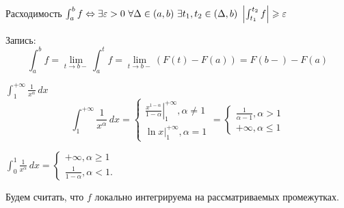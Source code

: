 \begin{Rem}
	Расходимость $\int_a^b f \Leftrightarrow \exists \varepsilon > 0 \ \forall \Delta \in (a, b) \ \exists t_1, t_2 \in (\Delta, b) \ \left| \int_{t_1}^{t_2} f\right| \geqslant \varepsilon$
\end{Rem}

\begin{Rem}
	Запись:
	\[\int_a^b f = \lim_{t \to b-}\int_a^t f = \lim_{t \to b-} (F(t) - F(a)) = F(b-) - F(a)\]
\end{Rem}

\begin{Example}
	$\int_1^{+\infty} \frac{1}{x^{\alpha}} \, dx$
	\[\int_1^{+\infty} \frac{1}{x^\alpha}\,dx = \begin{cases}
		\left.\frac{x^{1 - \alpha}}{1 - \alpha}\right|_{1}^{+\infty}, \alpha \neq 1 \\
		\left.\ln x\right|_1^{+\infty}, \alpha = 1
	\end{cases} = \begin{cases}
		\frac{1}{\alpha - 1}, \alpha > 1 \\
		+\infty, \alpha \leqslant 1
	\end{cases}\] 
\end{Example}

\begin{Example}
	$\int_0^1 \frac{1}{x^\alpha} \,dx = \begin{cases}
		+\infty, \alpha \geqslant 1 \\
		\frac{1}{1 - \alpha}, \alpha < 1.
	\end{cases}$ 
\end{Example}


Будем считать, что $f$ локально интегрируема на рассматриваемых промежутках.

